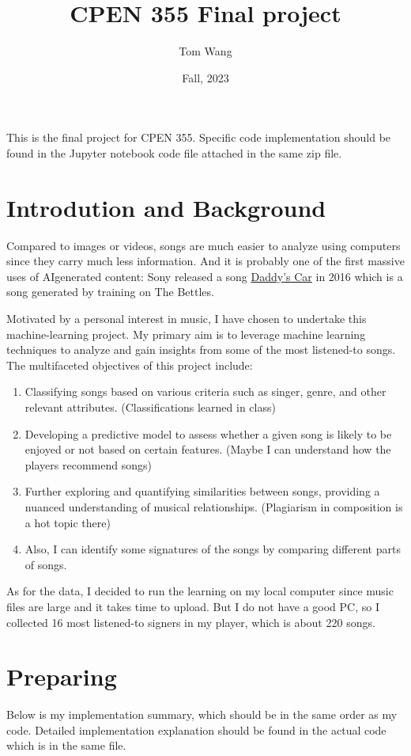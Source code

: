 \documentclass[letterpaper,12pt]{article}
\title{CPEN 355 Final project}
\author{Tom Wang}
\date{Fall, 2023}
\begin{document}
\maketitle
\thispagestyle{plain}


This is the final project for CPEN 355. Specific code implementation should be found in the Jupyter notebook code file attached in the same zip file.
\section{Introdution and Background}
Compared to images or videos, songs are much easier to analyze using computers since they carry much less information. And it is probably one of the first massive uses of AI\-generated content: Sony released a song \href{https://www.youtube.com/watch?v=LSHZ_b05W7o}{Daddy's Car} in 2016 which is a song generated by training on The Bettles.

Motivated by a personal interest in music, I have chosen to undertake this machine-learning project. My primary aim is to leverage machine learning techniques to analyze and gain insights from some of the most listened-to songs. The multifaceted objectives of this project include:

\begin{enumerate}
    \item Classifying songs based on various criteria such as singer, genre, and other relevant attributes. (Classifications learned in class)
    \item Developing a predictive model to assess whether a given song is likely to be enjoyed or not based on certain features. (Maybe I can understand how the players recommend songs)
    \item Further exploring and quantifying similarities between songs, providing a nuanced understanding of musical relationships. (Plagiarism in composition is a hot topic there)
    \item Also, I can identify some signatures of the songs by comparing different parts of songs.
\end{enumerate}

As for the data, I decided to run the learning on my local computer since music files are large and it takes time to upload. But I do not have a good PC, so I collected 16 most listened-to signers in my player, which is about 220 songs.

\section{Preparing}
Below is my implementation summary, which should be in the same order as my code. Detailed implementation explanation should be found in the actual code which is in the same file.
\end{document}
